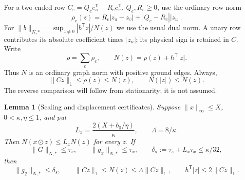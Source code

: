 \documentclass[11pt]{article}
\newtheorem{lemma}[theorem]{Lemma}
\theoremstyle{definition}\newtheorem{definition}[theorem]{Definition}
\theoremstyle{remark}\newtheorem{remark}[theorem]{Remark}
\begin{document}
For a two-ended row $C_e=Q_e e_u^{\mathsf T}-R_e e_v^{\mathsf T}$,
$Q_e,R_e\ge0$, use the ordinary row norm
\[
 \rho_e(z)=R_e|z_u-z_v|+|Q_e-R_e||z_u|.
\]
For $\|b\|_{N,*}=\sup_{z\ne0}|b^{\mathsf T}z|/N(z)$ we use the usual dual norm. A unary row contributes its absolute coefficient times $|z_u|$; its
physical sign is retained in $C$. Write
\[
 \rho=\sum_e\rho_e,\qquad N(z)=\rho(z)+h^{\mathsf T}|z|.
\]
Thus $N$ is an ordinary graph norm with positive ground edges. Always,
\begin{equation}\label{eq:recovery-proxy-basic}
 \|Cz\|_1\le\rho(z)\le N(z),\qquad N(|z|)\le N(z).
\end{equation}
The reverse comparison will follow from stationarity; it is not assumed.

\begin{lemma}[Scaling and displacement certificates]
\label{lem:recovery-absorption}
Suppose $\|x\|_\infty\le X$, $0<\kappa,\eta\le1$, and put
\[
 L_x=\frac{2(X+b_0/\eta)}\kappa,\qquad \Lambda=8/\kappa.
\]
Then $N(x\odot z)\le L_xN(z)$ for every $z$. If
\[
 \|G\|_{N,*}\le\tau_s,\qquad \|g_x\|_{N,*}\le\tau_x,
 \qquad \delta_s:=\tau_s+L_x\tau_x\le\kappa/32,
\]
then
\begin{equation}\label{eq:recovery-norm-certificate}
 \|g_q\|_{N,*}\le\delta_s,\qquad
 \|Cz\|_1\le N(z)\le\Lambda\|Cz\|_1,\qquad
 h^{\mathsf T}|z|\le2\|Cz\|_1.
\end{equation}
\end{lemma}
\end{document}
